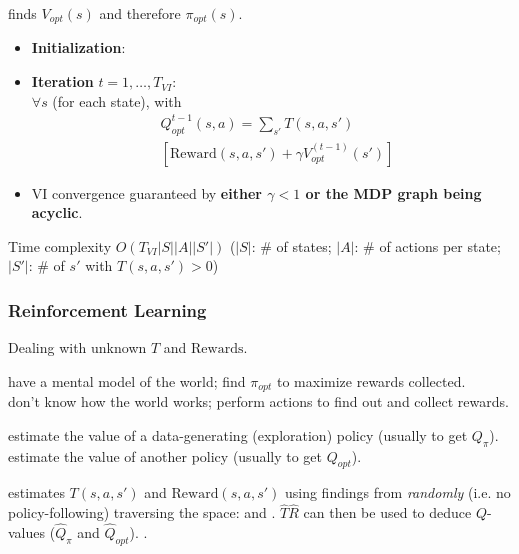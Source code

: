  finds $V_{opt}(s)$ and therefore $\pi_{opt}(s)$.
\begin{itemize}
    \item \textbf{Initialization}: 
    \item \textbf{Iteration} $t = 1,\dots,T_{VI}$:\\
        $\forall s$ (for each state), 
        with \begin{displaymath}
            \boxed{
                \begin{aligned}
                    &Q_{opt}^{t-1}(s,a) = \sum_{s'}T(s,a,s')\\
                    &\left[\text{Reward}(s,a,s') + \gamma V_{opt}^{(t-1)}(s')\right]
                \end{aligned}
            }
        \end{displaymath}
    \item VI convergence guaranteed by
        \textbf{either $\gamma < 1$ or the MDP graph being acyclic}.
\end{itemize}
Time complexity $O(T_{VI}|S||A||S'|)$ ($|S|$: \# of states; $|A|$: \# of
actions per state; $|S'|$: \# of $s'$ with $T(s,a,s') > 0$)

\subsubsection{Reinforcement Learning}

Dealing with unknown $T$ and $\text{Rewards}$.

 have a mental model of the world; find
$\pi_{opt}$ to maximize rewards collected.\\
 don't know how the world works;
perform actions to find out and collect rewards.

 estimate the value of a data-generating (exploration)
policy (usually to get $Q_{\pi}$).\\
 estimate the value of another policy (usually to get
$Q_{opt}$).

 estimates $T(s,a,s')$ and
$\text{Reward}(s,a,s')$ using findings from \emph{randomly} (i.e. no
policy-following) traversing the space:
and .
$\hat{T} \hat{R}$ can then be used to deduce $Q$-values ($\hat{Q}_\pi$ and
$\hat{Q}_{opt}$). .

